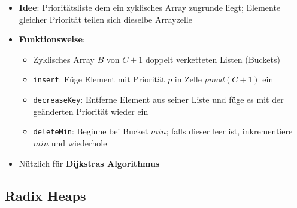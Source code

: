 \documentclass[10pt,a4paper]{article}
\begin{document}
  	\begin{itemize}
  		\item \textbf{Idee}: Prioritätsliste dem ein zyklisches Array zugrunde liegt; Elemente gleicher Priorität teilen sich dieselbe Arrayzelle
  		\item \textbf{Funktionsweise}:
  		\begin{itemize}
  			\item Zyklisches Array $B$ von $C + 1$ doppelt verketteten Listen (Buckets)
  			\item \texttt{insert}: Füge Element mit Priorität $p$ in Zelle $p mod (C + 1)$ ein
  			\item \texttt{decreaseKey}: Entferne Element aus seiner Liste und füge es mit der geänderten Priorität wieder ein
  			\item \texttt{deleteMin}: Beginne bei Bucket $min$; falls dieser leer ist, inkrementiere $min$ und wiederhole
  		\end{itemize}
  		\item Nützlich für \textbf{Dijkstras Algorithmus}
  	\end{itemize}

  	\subsection{Radix Heaps}
  	\label{sub:radix_heaps}
  	
\end{document}
